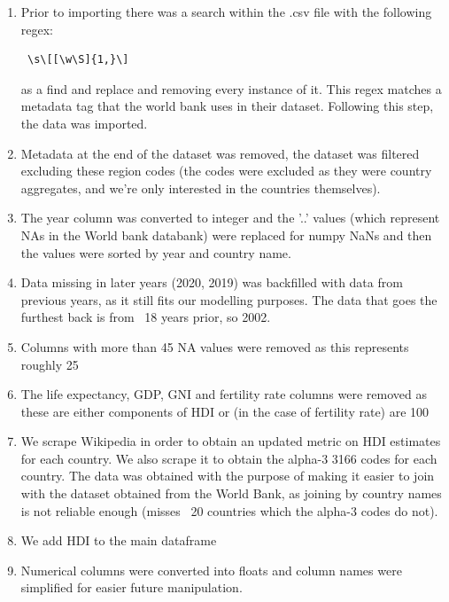 \documentclass[]{article}
\begin{document}
\begin{enumerate}
  \item Prior to importing there was a search within the .csv file with the following regex: \begin{verbatim} \s\[[\w\S]{1,}\] \end{verbatim} as a find and replace and removing every instance of it. This regex matches a metadata tag that the world bank uses in their dataset. Following this step, the data was imported.

  \item Metadata at the end of the dataset was removed, the dataset was filtered excluding these region codes (the codes were excluded as they were country aggregates, and we're only interested in the countries themselves).

  \item The year column was converted to integer and the '..' values (which represent NAs in the World bank databank) were replaced for numpy NaNs and then the values were sorted by year and country name.

  \item Data missing in later years (2020, 2019) was backfilled with data from previous years, as it still fits our modelling purposes. The data that goes the furthest back is from ~18 years prior, so 2002.

  \item Columns with more than 45 NA values were removed as this represents roughly 25%

  \item The life expectancy, GDP, GNI and fertility rate columns were removed as these are either components of HDI or (in the case of fertility rate) are 100%

  \item We scrape Wikipedia in order to obtain an updated metric on HDI estimates for each country. We also scrape it to obtain the alpha-3 3166 codes for each country. The data was obtained with the purpose of making it easier to join with the dataset obtained from the World Bank, as joining by country names is not reliable enough (misses ~20 countries which the alpha-3 codes do not).

  \item We add HDI to the main dataframe

  \item Numerical columns were converted into floats and column names were simplified for easier future manipulation.


\end{enumerate}
\end{document}
